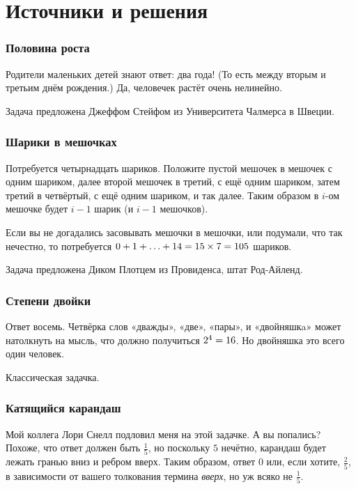 \section*{Источники и решения}

\subsubsection*{Половина роста}

Родители маленьких детей знают ответ: два года!
(То есть между вторым и третьим днём рождения.)
Да, человечек растёт очень нелинейно.

Задача предложена Джеффом Стейфом из Университета Чалмерса в Швеции.

\subsubsection*{Шарики в мешочках}

Потребуется четырнадцать шариков.
Положите пустой мешочек в мешочек с одним шариком, 
далее второй мешочек в третий, с ещё одним шариком, затем третий в четвёртый, с ещё одним шариком, и так далее.
Таким образом в $i$-ом мешочке будет $i-1$ шарик (и $i-1$ мешочков).

Если вы не догадались засовывать мешочки в мешочки, или подумали, что так нечестно, то потребуется $0 + 1 \z+ \z\dots \z+ 14 \z= 15 \times 7 \z= 105$ шариков.

Задача предложена Диком Плотцем из Провиденса, штат Род-Айленд.

\subsubsection*{Степени двойки}

Ответ восемь.
Четвёрка слов «дважды», «две», «пары», и «двойняшкa» может натолкнуть на мысль, что должно получиться $2^4 \z= 16$.
Но двойняшка это всего один человек.

Классическая задачка.

\subsubsection*{Катящийся карандаш}

Мой коллега Лори Снелл подловил меня на этой задачке.
А вы попались?
Похоже, что ответ должен быть $\tfrac15$, но поскольку $5$ нечётно, карандаш будет лежать гранью вниз и ребром вверх.
Таким образом, ответ $0$ или, если хотите, $\tfrac25$, в зависимости от вашего толкования термина \emph{вверх}, но уж всяко не $\tfrac15$.

